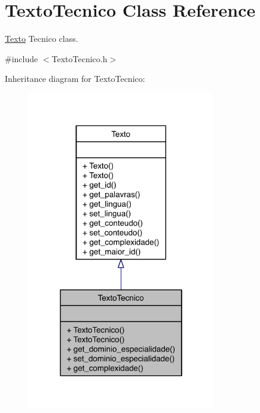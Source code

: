 \hypertarget{class_texto_tecnico}{\section{Texto\-Tecnico Class Reference}
\label{class_texto_tecnico}
}


\hyperlink{class_texto}{Texto} Tecnico class.  




{\ttfamily \#include $<$Texto\-Tecnico.\-h$>$}



Inheritance diagram for Texto\-Tecnico\-:
\nopagebreak
\begin{figure}[H]
\begin{center}
\leavevmode
\includegraphics[width=232pt]{class_texto_tecnico__inherit__graph}
\end{center}
\end{figure}
